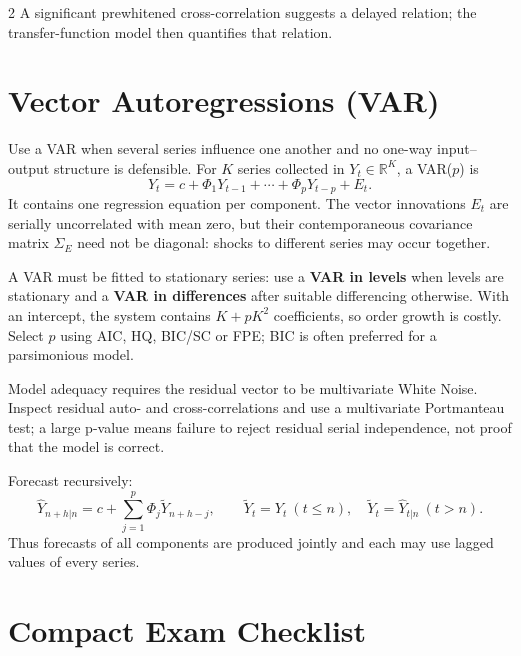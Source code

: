 \documentclass[9pt,a4paper]{extarticle}
\newcommand{\key}[1]{\textbf{#1}}
\begin{document}
\begin{multicols}{2}
A significant prewhitened cross-correlation suggests a delayed relation; the transfer-function model then quantifies that relation.

\section{Vector Autoregressions (VAR)}

Use a VAR when several series influence one another and no one-way input--output structure is defensible. For \(K\) series collected in \(Y_t\in\mathbb R^K\), a VAR(\(p\)) is
\[
\boxed{Y_t=c+\Phi_1Y_{t-1}+\cdots+\Phi_pY_{t-p}+E_t.}
\]
It contains one regression equation per component. The vector innovations \(E_t\) are serially uncorrelated with mean zero, but their contemporaneous covariance matrix \(\Sigma_E\) need not be diagonal: shocks to different series may occur together.

A VAR must be fitted to stationary series: use a \key{VAR in levels} when levels are stationary and a \key{VAR in differences} after suitable differencing otherwise. With an intercept, the system contains \(K+pK^2\) coefficients, so order growth is costly. Select \(p\) using AIC, HQ, BIC/SC or FPE; BIC is often preferred for a parsimonious model.

Model adequacy requires the residual vector to be multivariate White Noise. Inspect residual auto- and cross-correlations and use a multivariate Portmanteau test; a large p-value means failure to reject residual serial independence, not proof that the model is correct.

Forecast recursively:
\[
\boxed{\widehat Y_{n+h|n}=c+\sum_{j=1}^{p}\Phi_j
\widetilde Y_{n+h-j},\qquad
\widetilde Y_t=Y_t\ (t\le n),\quad
\widetilde Y_t=\widehat Y_{t|n}\ (t>n).}
\]
Thus forecasts of all components are produced jointly and each may use lagged values of every series.

\section{Compact Exam Checklist}


\end{multicols}
\end{document}
